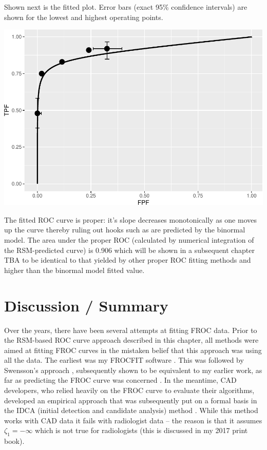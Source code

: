 \documentclass[
]{book}
\newenvironment{Shaded}{\begin{snugshade}}{\end{snugshade}}
\newcommand{\KeywordTok}[1]{\textcolor[rgb]{0.13,0.29,0.53}{\textbf{#1}}}
\newcommand{\NormalTok}[1]{#1}
\newcommand{\OperatorTok}[1]{\textcolor[rgb]{0.81,0.36,0.00}{\textbf{#1}}}
\begin{document}
Shown next is the fitted plot. Error bars (exact 95\% confidence intervals) are shown for the lowest and highest operating points.

\begin{Shaded}
\end{Shaded}

\includegraphics{11-rsm-fitting_files/figure-latex/unnamed-chunk-2-1.pdf}

The fitted ROC curve is proper: it's slope decreases monotonically as one moves up the curve thereby ruling out hooks such as are predicted by the binormal model. The area under the proper ROC (calculated by numerical integration of the RSM-predicted curve) is 0.906 which will be shown in a subsequent chapter TBA to be identical to that yielded by other proper ROC fitting methods and higher than the binormal model fitted value.

\hypertarget{rsm-fitting-discussion-summary}{%
\section{Discussion / Summary}\label{rsm-fitting-discussion-summary}}

Over the years, there have been several attempts at fitting FROC data. Prior to the RSM-based ROC curve approach described in this chapter, all methods were aimed at fitting FROC curves in the mistaken belief that this approach was using all the data. The earliest was my FROCFIT software \citep{chakraborty1989maximum}. This was followed by Swensson's approach \citep{swensson1996unified}, subsequently shown to be equivalent to my earlier work, as far as predicting the FROC curve was concerned \citep{chakraborty2008operating}. In the meantime, CAD developers, who relied heavily on the FROC curve to evaluate their algorithms, developed an empirical approach that was subsequently put on a formal basis in the IDCA (initial detection and candidate analysis) method \citep{edwards2002maximum}. While this method works with CAD data it fails with radiologist data -- the reason is that it assumes \(\zeta_1 = -\infty\) which is not true for radiologists (this is discussed in my 2017 print book).
\end{document}
